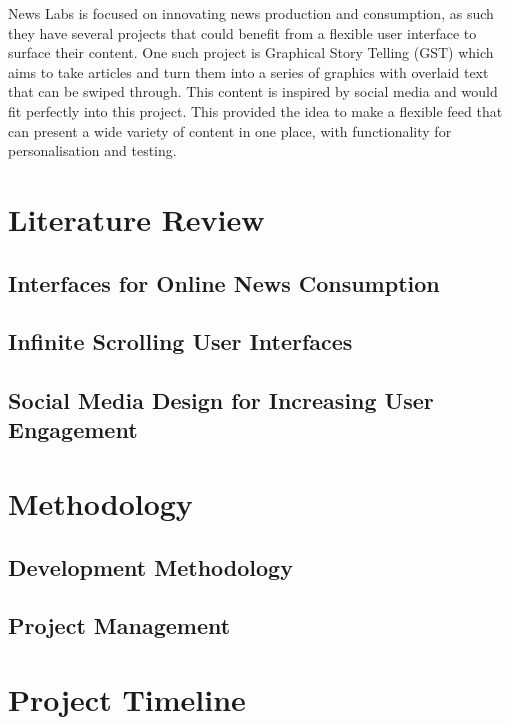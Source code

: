 \documentclass[12pt,titlepage]{article}
\begin{document}
  News Labs is focused on innovating news production and consumption, as such
  they have several projects that could benefit from a flexible user interface
  to surface their content. One such project is Graphical Story Telling (GST)
  which aims to take articles and turn them into a series of graphics with
  overlaid text that can be swiped through. This content is inspired by social
  media and would fit perfectly into this project. This provided the idea to
  make a flexible feed that can present a wide variety of content in one place,
  with functionality for personalisation and testing.

\section{Literature Review}

  \subsection{Interfaces for Online News Consumption}

  \subsection{Infinite Scrolling User Interfaces}

  \subsection{Social Media Design for Increasing User Engagement}

\section{Methodology}

  \subsection{Development Methodology}

  \subsection{Project Management}

\section{Project Timeline}


{}

\end{document}
